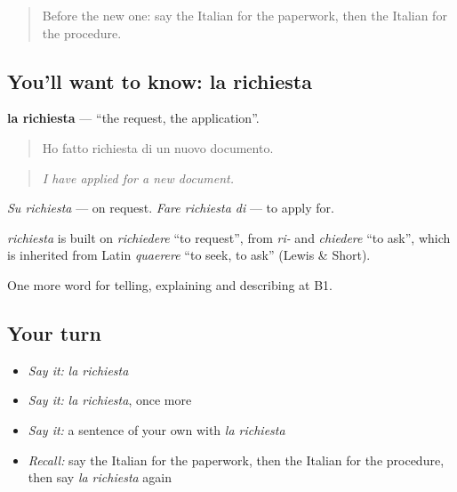 \label{lesson:IT-C389-richiesta}



\begin{quote}
Before the new one: say the Italian for the paperwork, then the Italian for the procedure.
\end{quote}

\subsection*{You'll want to know: la richiesta}
\textbf{la richiesta} — \textquotedblleft{}the request, the application\textquotedblright{}.

\begin{quote}
Ho fatto richiesta di un nuovo documento.
\end{quote}

\begin{quote}
\emph{I have applied for a new document.}
\end{quote}

\emph{Su richiesta} — on request. \emph{Fare richiesta di} — to apply for.

\begin{cousinweb}
\emph{richiesta} is built on \emph{richiedere} \textquotedblleft{}to request\textquotedblright{}, from \emph{ri-} and \emph{chiedere} \textquotedblleft{}to ask\textquotedblright{}, which is inherited from Latin \emph{quaerere} \textquotedblleft{}to seek, to ask\textquotedblright{} (Lewis \& Short).
\end{cousinweb}

\begin{grammarlens}[title={What you've built}]
One more word for telling, explaining and describing at B1.
\end{grammarlens}

\subsection*{Your turn}
\begin{itemize}
\raggedright
  \item \emph{Say it:} \emph{la richiesta}
  \item \emph{Say it:} \emph{la richiesta}, once more
  \item \emph{Say it:} a sentence of your own with \emph{la richiesta}
  \item \emph{Recall:} say the Italian for the paperwork, then the Italian for the procedure, then say \emph{la richiesta} again
\end{itemize}

